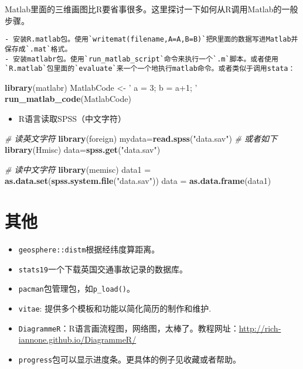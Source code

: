\documentclass[
]{book}
\newenvironment{Shaded}{\begin{snugshade}}{\end{snugshade}}
\newcommand{\CommentTok}[1]{\textcolor[rgb]{0.56,0.35,0.01}{\textit{#1}}}
\newcommand{\KeywordTok}[1]{\textcolor[rgb]{0.13,0.29,0.53}{\textbf{#1}}}
\newcommand{\NormalTok}[1]{#1}
\newcommand{\StringTok}[1]{\textcolor[rgb]{0.31,0.60,0.02}{#1}}
\providecommand{\tightlist}{%
  \setlength{\itemsep}{0pt}\setlength{\parskip}{0pt}}
\begin{document}
Matlab里面的三维画图比R要省事很多。这里探讨一下如何从R调用Matlab的一般步骤。

\begin{verbatim}
- 安装R.matlab包。使用`writemat(filename,A=A,B=B)`把R里面的数据写进Matlab并保存成`.mat`格式。
- 安装matlabr包。使用`run_matlab_script`命令来执行一个`.m`脚本。或者使用`R.matlab`包里面的`evaluate`来一个一个地执行matlab命令。或者类似于调用stata：
\end{verbatim}

\begin{Shaded}
\begin{Highlighting}[]
    \KeywordTok{library}\NormalTok{(matlabr)}
\NormalTok{    MatlabCode <-}\StringTok{ '}
\StringTok{    a = 3;}
\StringTok{    b = a+1;}
\StringTok{    '}
    \KeywordTok{run_matlab_code}\NormalTok{(MatlabCode)}
\end{Highlighting}
\end{Shaded}

\begin{itemize}
\tightlist
\item
  R语言读取SPSS（中文字符）
\end{itemize}

\begin{Shaded}
\begin{Highlighting}[]
\CommentTok{# 读英文字符}
\KeywordTok{library}\NormalTok{(foreign)  }
\NormalTok{mydata=}\KeywordTok{read.spss}\NormalTok{(}\StringTok{"data.sav"}\NormalTok{)  }
\CommentTok{# 或者如下}
\KeywordTok{library}\NormalTok{(Hmisc)  }
\NormalTok{data=}\KeywordTok{spss.get}\NormalTok{(}\StringTok{"data.sav"}\NormalTok{) }

\CommentTok{# 读中文字符}
\KeywordTok{library}\NormalTok{(memisc)}
\NormalTok{data1 =}\StringTok{ }\KeywordTok{as.data.set}\NormalTok{(}\KeywordTok{spss.system.file}\NormalTok{(}\StringTok{"data.sav"}\NormalTok{))}
\NormalTok{data =}\StringTok{ }\KeywordTok{as.data.frame}\NormalTok{(data1)}
\end{Highlighting}
\end{Shaded}

\hypertarget{ux5176ux4ed6}{%
\chapter{其他}\label{ux5176ux4ed6}}

\begin{itemize}
\tightlist
\item
  \texttt{geosphere::distm}根据经纬度算距离。
\item
  \texttt{stats19}一个下载英国交通事故记录的数据库。
\item
  \texttt{pacman}包管理包，如\texttt{p\_load()}。
\item
  \texttt{vitae}: 提供多个模板和功能以简化简历的制作和维护.
\item
  \texttt{DiagrammeR}：R语言画流程图，网络图，太棒了。教程网址：\url{http://rich-iannone.github.io/DiagrammeR/}
\item
  \texttt{progress}包可以显示进度条。更具体的例子见收藏或者帮助。
\end{itemize}
\end{document}
